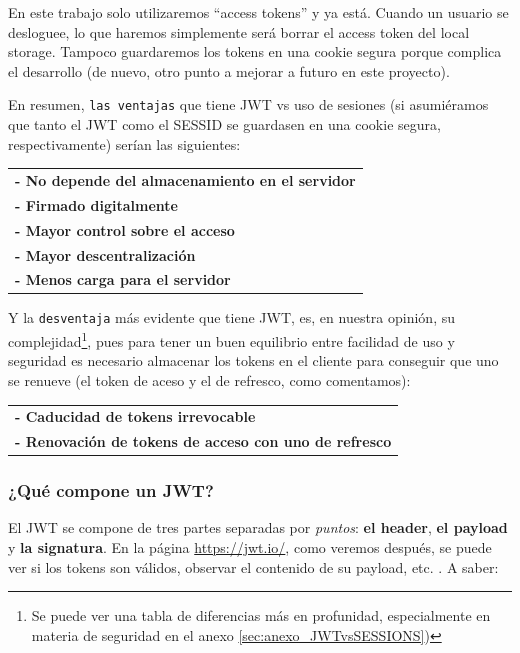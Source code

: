 \documentclass[a4paper,12pt]{report}
\begin{document}
				
				
				En este trabajo solo utilizaremos ``access tokens'' y ya está. Cuando un usuario se desloguee, lo que haremos simplemente será borrar el access token del local storage. Tampoco guardaremos los tokens en una cookie segura porque complica el desarrollo (de nuevo, otro punto a mejorar a futuro en este proyecto).
			
				 
				 \noindent En resumen, \texttt{las ventajas} que tiene JWT vs uso de sesiones (si asumiéramos que tanto el JWT como el SESSID se guardasen en una cookie segura, respectivamente) serían las siguientes:
				 
					\begin{tabular}{l}
						\textbf{- No depende del almacenamiento en el servidor} \\
						\textbf{- Firmado digitalmente} \\
						\textbf{- Mayor control sobre el acceso} \\
						\textbf{- Mayor descentralización} \\
						\textbf{- Menos carga para el servidor}
					\end{tabular}
									 
				   \noindent Y la \texttt{desventaja} más evidente que tiene JWT, es, en nuestra opinión, su complejidad\footnote{Se puede ver una tabla de diferencias más en profunidad, especialmente en materia de seguridad en el anexo \ref{sec:anexo_JWTvsSESSIONS})}, pues para tener un buen equilibrio entre facilidad de uso y seguridad es necesario almacenar los tokens en el cliente para conseguir que uno se renueve (el token de aceso y el de refresco, como comentamos):
				  
				  \begin{tabular}{l}
					 \textbf{- Caducidad de tokens irrevocable}\\
					 \textbf{- Renovación de tokens de acceso con uno de refresco}
				  \end{tabular}
				 

				
				
				
				\subsubsection{¿Qué compone un JWT?}
				\label{sec:queComponeJWTbackend}
				
				\noindent El JWT se compone de tres partes separadas por \textit{puntos}: \textbf{el header}, \textbf{el payload} y \textbf{la signatura}. En la página \href{https://jwt.io/}{https://jwt.io/}, como veremos después, se puede ver si los tokens son válidos, observar el contenido de su payload, etc. \cite{jwtio}. A saber:
				
\end{document}
